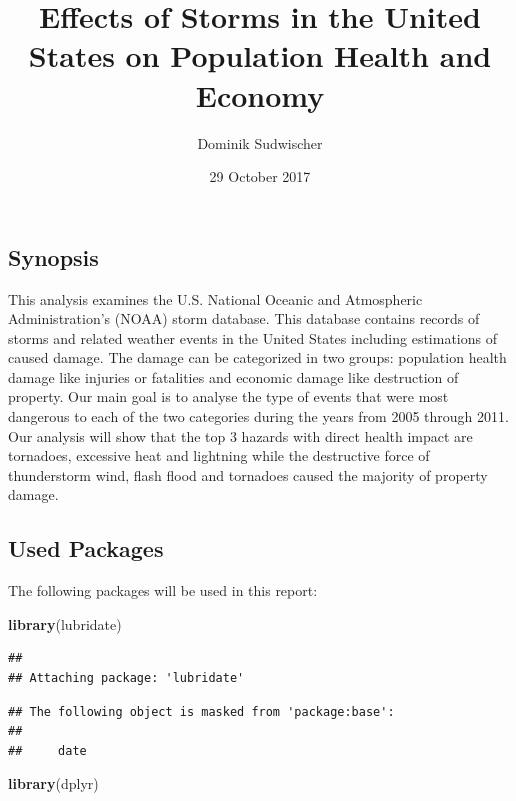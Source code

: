 \documentclass[]{article}
\title{Effects of Storms in the United States on Population Health and Economy}
\author{Dominik Sudwischer}
\date{29 October 2017}
\newenvironment{Shaded}{\begin{snugshade}}{\end{snugshade}}
\newcommand{\KeywordTok}[1]{\textcolor[rgb]{0.13,0.29,0.53}{\textbf{{#1}}}}
\newcommand{\NormalTok}[1]{{#1}}
\begin{document}
\maketitle

\subsection{Synopsis}\label{synopsis}

This analysis examines the U.S. National Oceanic and Atmospheric
Administration's (NOAA) storm database. This database contains records
of storms and related weather events in the United States including
estimations of caused damage. The damage can be categorized in two
groups: population health damage like injuries or fatalities and
economic damage like destruction of property. Our main goal is to
analyse the type of events that were most dangerous to each of the two
categories during the years from 2005 through 2011. Our analysis will
show that the top 3 hazards with direct health impact are tornadoes,
excessive heat and lightning while the destructive force of thunderstorm
wind, flash flood and tornadoes caused the majority of property damage.

\subsection{Used Packages}\label{used-packages}

The following packages will be used in this report:

\begin{Shaded}
\begin{Highlighting}[]
\KeywordTok{library}\NormalTok{(lubridate)}
\end{Highlighting}
\end{Shaded}

\begin{verbatim}
## 
## Attaching package: 'lubridate'
\end{verbatim}

\begin{verbatim}
## The following object is masked from 'package:base':
## 
##     date
\end{verbatim}

\begin{Shaded}
\begin{Highlighting}[]
\KeywordTok{library}\NormalTok{(dplyr)}
\end{Highlighting}
\end{Shaded}
\end{document}
